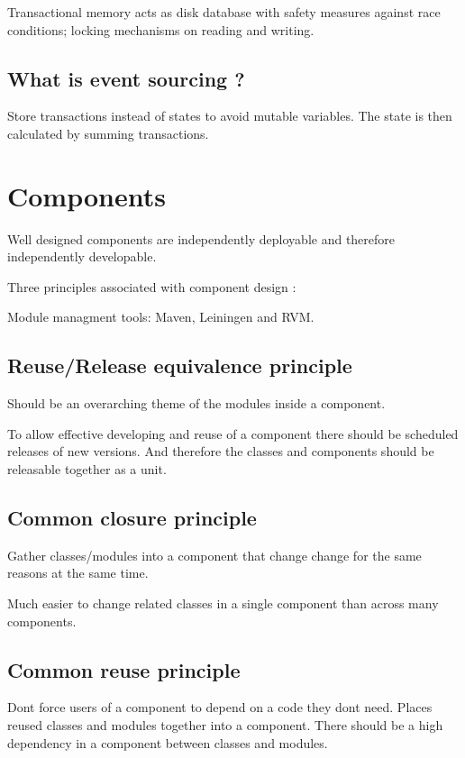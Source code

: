 \documentclass[11pt]{scrartcl} %
\begin{document}
Transactional memory acts as disk database with safety measures against
race conditions; locking mechanisms on reading and writing.

\subsection{What is event sourcing ?}

Store transactions instead of states to avoid mutable variables. The
state is then calculated by summing transactions.

\section{Components}

Well designed components are independently deployable and therefore
independently developable.

Three principles associated with component design :

Module managment tools: Maven, Leiningen and RVM.

\subsection{Reuse/Release equivalence principle}

Should be an overarching theme of the modules inside a component.

To allow effective developing and reuse of a component there should be
scheduled releases of new versions. And therefore the classes and
components should be releasable together as a unit.

\subsection{Common closure principle}

Gather classes/modules into a component that change change for the same
reasons at the same time.

Much easier to change related classes in a single component than across
many components.

\subsection{Common reuse principle}

Dont force users of a component to depend on a code they dont need.
Places reused classes and modules together into a component. There
should be a high dependency in a component between classes and modules.
\end{document}
